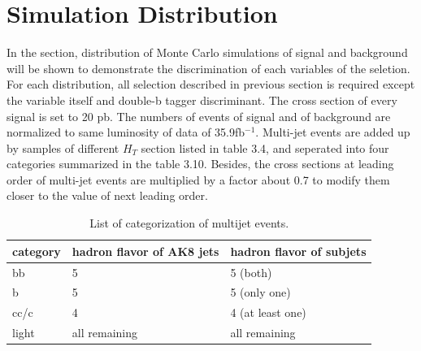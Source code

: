 \section{Simulation Distribution} 
In the section, distribution of Monte Carlo simulations of signal and background will be shown to demonstrate the discrimination of each variables of the seletion. For each distribution, all selection described in previous section is required except the variable itself and double-b tagger discriminant. The cross section of every signal is set to 20 pb. The numbers of events of signal and of background are normalized to same luminosity of data of 35.9fb$^{-1}$. Multi-jet events are added up by samples of different $H_T$ section listed in table 3.4, and seperated into four categories summarized in the table 3.10.  Besides, the cross sections at leading order of multi-jet events are multiplied by a factor about 0.7 to modify them closer to the value of next leading order.

\begin{table}[h!]
  \begin{center}
    \begin{tabular}{lll}
    category & hadron flavor of AK8 jets & hadron flavor of subjets \\
    \hline
    bb & 5 & 5 (both) \\
    b & 5 & 5 (only one) \\
    cc/c & 4 & 4 (at least one) \\
    light & all remaining & all remaining \\
	\hline
    \end{tabular}
  \end{center}

  \caption{List of categorization of multijet events.}
\end{table} 

